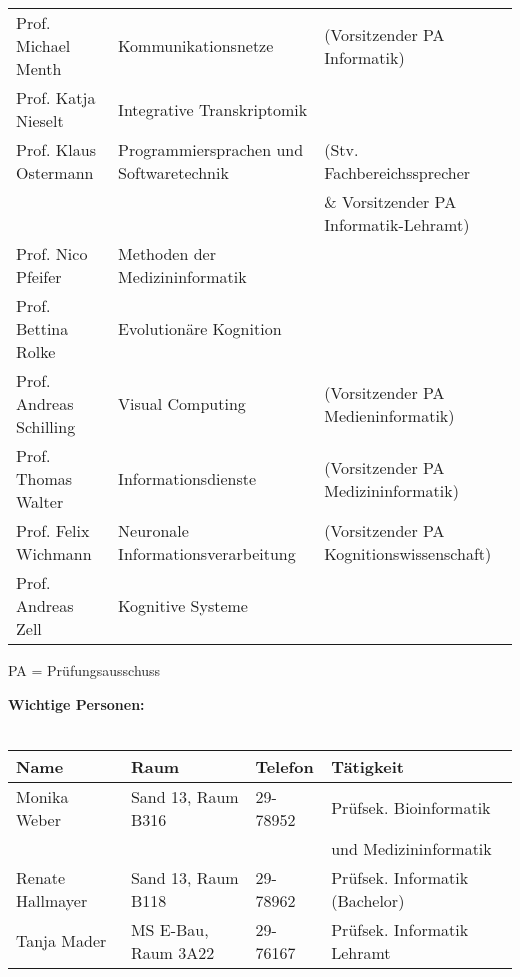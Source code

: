 \begin{tabular}{|lll|}
Prof. Michael Menth           & Kommunikationsnetze 		& (Vorsitzender PA Informatik)\\
Prof. Katja Nieselt	          & Integrative Transkriptomik	 & \\
Prof. Klaus Ostermann	      & Programmiersprachen und Softwaretechnik & (Stv. Fachbereichssprecher  \\
                              &                                         & \& Vorsitzender PA Informatik-Lehramt) \\
Prof. Nico Pfeifer			  & Methoden der Medizininformatik &\\
Prof. Bettina Rolke 		  & Evolutionäre Kognition &\\
Prof. Andreas Schilling       & Visual Computing &(Vorsitzender PA Medieninformatik)\\
Prof. Thomas Walter           & Informationsdienste			 & (Vorsitzender PA Medizininformatik) \\
Prof. Felix Wichmann          & Neuronale Informationsverarbeitung &  (Vorsitzender PA Kognitionswissenschaft)	\\
Prof. Andreas Zell            & Kognitive Systeme 		 &\\
\hline
\end{tabular}
\scriptsize{PA = Prüfungsausschuss}


\textbf{Wichtige Personen:}\\\\
\begin{tabular}{|llll|}
\hline
Name                  & Raum		       & Telefon    & Tätigkeit \hfill\\
\hline
\hline
Monika Weber          & Sand 13, Raum B316    & 29-78952   & Prüfsek. Bioinformatik\\
                      &                       &            & und Medizininformatik \\
Renate Hallmayer      & Sand 13, Raum B118    & 29-78962   & Prüfsek. Informatik (Bachelor) \\
Tanja Mader      & MS E-Bau, Raum 3A22    & 29-76167   & Prüfsek. Informatik Lehramt \\
\hline
\end{tabular} \\

